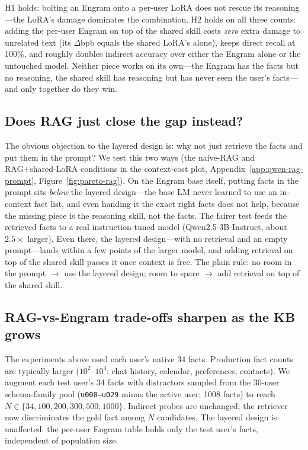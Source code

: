 \documentclass[letterpaper]{article} %
\begin{document}
H1 holds: bolting an Engram onto a per-user LoRA does not rescue its
reasoning---the LoRA's damage dominates the combination. H2 holds on
all three counts: adding the per-user Engram on top of the shared
skill costs \emph{zero} extra damage to unrelated text (its
$\Delta$bpb equals the shared LoRA's alone), keeps direct recall at
100\%, and roughly doubles indirect accuracy over either the Engram
alone or the untouched model. Neither piece works on its own---the
Engram has the facts but no reasoning, the shared skill has reasoning
but has never seen the user's facts---and only together do they win.

\subsection{Does RAG just close the gap instead?}
\label{sec:layered-rag}
\label{sec:qwen-rag}

The obvious objection to the layered design is: why not just
retrieve the facts and put them in the prompt? We test this two ways
(the naive-RAG and RAG+shared-LoRA conditions in the context-cost
plot, Appendix~\ref{app:qwen-rag-prompt}, Figure~\ref{fig:pareto-rag}). On
the Engram base itself, putting facts in the prompt sits
\emph{below} the layered design---the base LM never learned to use
an in-context fact list, and even
handing it the exact right facts does not help, because the missing
piece is the reasoning skill, not the facts. The fairer test feeds the
retrieved facts to a real instruction-tuned model
(Qwen2.5-3B-Instruct, about $2.5\times$ larger). Even there, the
layered design---with no retrieval and an empty prompt---lands within
a few points of the larger model, and adding retrieval on top of the
shared skill passes it once context is free. The plain rule: no
room in the prompt $\to$ use the layered design; room to spare $\to$
add retrieval on top of the shared skill.

\subsection{RAG-vs-Engram trade-offs sharpen as the KB grows}
\label{sec:rag-scale}

The experiments above used each user's native 34 facts. Production fact counts are
typically larger ($10^2$--$10^3$: chat history, calendar,
preferences, contacts). We augment each test user's 34 facts
with distractors sampled from the 30-user schema-family pool
(\texttt{u000--u029} minus the active user; 1008 facts) to reach
$N \in \{34, 100, 200, 300, 500, 1000\}$. Indirect probes are
unchanged; the retriever now discriminates the gold fact among
$N$ candidates. The layered design is unaffected: the per-user
Engram table holds only the test user's facts, independent of
population size.
\end{document}
